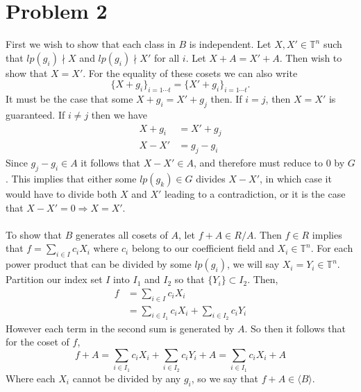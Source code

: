 \documentclass{article}
\theoremstyle{definition}
\begin{document}
\section*{Problem 2}
First we wish to show that each class in $B$ is independent.
Let $X,X' \in \mathbb{T}^n$ such that $lp(g_i) \nmid X$ and $lp(g_i) \nmid X'$ for all $i$.
Let $X + A = X' + A$. Then wish to show that $X = X'$. For the equality of these 
cosets we can also write
\[
    \{X + g_i\}_{i = 1\cdots t} = \{X' + g_i\}_{i = 1 \cdots t}
.\]
It must be the case that some $X + g_i = X' + g_j$ then. If $i = j$,
then $X = X'$ is guaranteed. If $i \neq j$ then we have 
\begin{align*}
    X + g_i &= X' + g_j \\
    X - X' &= g_j - g_i
\end{align*}
Since $g_j - g_i \in A$ it follows that $X - X' \in A$, and therefore must reduce 
to 0 by $G$. This implies that either some $lp(g_k) \in G$ divides $X - X'$, 
in which case it would have to divide both $X$ and $X'$ leading to a contradiction,
or it is the case that $X - X' = 0 \Longrightarrow X = X'$.
\\\\
To show that $B$ generates all cosets of $A$, let $f + A \in R / A$.
Then $f \in R$ implies that $f = \sum_{i \in I} c_i X_i$ where $c_i$ belong 
to our coefficient field and $X_i \in \mathbb{T}^n$. For each 
power product that can be divided by some $lp(g_i)$, we will say 
$X_i = Y_i \in \mathbb{T}^n$. Partition our index set $I$ into 
$I_1$ and $I_2$ so that $\{Y_i\} \subset I_2$. Then,
\begin{align*}
    f &= \sum_{i \in I}c_i X_i \\
    &= \sum_{i \in I_1} c_i X_i + \sum_{i \in I_2} c_i Y_i
\end{align*}
However each term in the second sum is generated by $A$. So then it follows that for the coset of $f$,
\[
    f + A = \sum_{i \in I_1} c_i X_i + \sum_{i \in I_2} c_i Y_i + A = \sum_{i \in I_1} c_i X_i + A
\]
Where each $X_i$ cannot be divided by any $g_i$, so we say that $f + A \in \langle B \rangle$.
\end{document}
